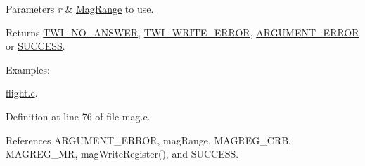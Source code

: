 \begin{DoxyParams}{Parameters}
{\em r} & \hyperlink{group__mag_ga3af649d913d146d6654db2354d88c18a}{Mag\-Range} to use. \\
\hline
\end{DoxyParams}
\begin{DoxyReturn}{Returns}
\hyperlink{group__error_gga2c3e4bb40f36b262a5214e2da2bca9c5a04d5943ba652af2205c88b247e0c659c}{T\-W\-I\-\_\-\-N\-O\-\_\-\-A\-N\-S\-W\-E\-R}, \hyperlink{group__error_gga2c3e4bb40f36b262a5214e2da2bca9c5ac0e3b3463dcaf220e54794b4711708c9}{T\-W\-I\-\_\-\-W\-R\-I\-T\-E\-\_\-\-E\-R\-R\-O\-R}, \hyperlink{group__error_gga2c3e4bb40f36b262a5214e2da2bca9c5a49ccf277a69dd938c591928aa27c66cc}{A\-R\-G\-U\-M\-E\-N\-T\-\_\-\-E\-R\-R\-O\-R} or \hyperlink{group__error_gga2c3e4bb40f36b262a5214e2da2bca9c5ac7f69f7c9e5aea9b8f54cf02870e2bf8}{S\-U\-C\-C\-E\-S\-S}. 
\end{DoxyReturn}
\begin{Desc}
\item[Examples\-: ]\par
\hyperlink{flight_8c-example}{flight.\-c}.\end{Desc}


Definition at line 76 of file mag.\-c.



References A\-R\-G\-U\-M\-E\-N\-T\-\_\-\-E\-R\-R\-O\-R, mag\-Range, M\-A\-G\-R\-E\-G\-\_\-\-C\-R\-B, M\-A\-G\-R\-E\-G\-\_\-\-M\-R, mag\-Write\-Register(), and S\-U\-C\-C\-E\-S\-S.


